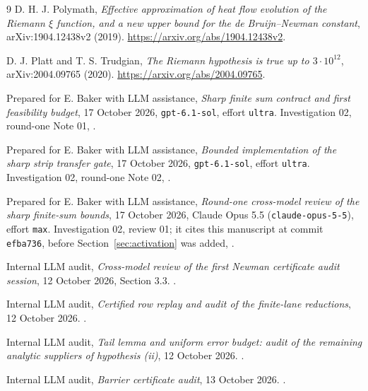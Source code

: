 \documentclass[11pt]{article}
\theoremstyle{remark}
\numberwithin{equation}{section}
\begin{document}
\begin{thebibliography}{9}
D. H. J. Polymath,
\emph{Effective approximation of heat flow evolution of the Riemann
$\xi$ function, and a new upper bound for the de Bruijn--Newman constant},
arXiv:1904.12438v2 (2019).
\url{https://arxiv.org/abs/1904.12438v2}.

D. J. Platt and T. S. Trudgian,
\emph{The Riemann hypothesis is true up to $3\cdot10^{12}$},
arXiv:2004.09765 (2020).
\url{https://arxiv.org/abs/2004.09765}.

Prepared for E. Baker with LLM assistance,
\emph{Sharp finite sum contract and first feasibility budget},
17 October 2026, \texttt{gpt-6.1-sol}, effort \texttt{ultra}.
Investigation 02, round-one Note 01,
.

Prepared for E. Baker with LLM assistance,
\emph{Bounded implementation of the sharp strip transfer gate},
17 October 2026, \texttt{gpt-6.1-sol}, effort \texttt{ultra}.
Investigation 02, round-one Note 02,
.

Prepared for E. Baker with LLM assistance,
\emph{Round-one cross-model review of the sharp finite-sum bounds},
17 October 2026, Claude Opus 5.5 (\texttt{claude-opus-5-5}), effort
\texttt{max}. Investigation 02, review 01; it cites this manuscript at
commit \texttt{efba736}, before Section~\ref{sec:activation} was added,
.

Internal LLM audit,
\emph{Cross-model review of the first Newman certificate audit session},
12 October 2026, Section 3.3.
.

Internal LLM audit,
\emph{Certified row replay and audit of the finite-lane reductions},
12 October 2026.
.

Internal LLM audit,
\emph{Tail lemma and uniform error budget: audit of the remaining analytic
suppliers of hypothesis (ii)}, 12 October 2026.
.

Internal LLM audit,
\emph{Barrier certificate audit}, 13 October 2026.
.
\end{thebibliography}
\end{document}
